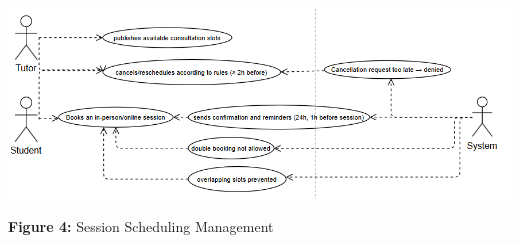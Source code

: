 

\begin{center}
\includegraphics[width=0.9\linewidth]{images/UC-03.png}
\end{center}

\begin{center}
\textbf{Figure 4:}  Session Scheduling Management
\end{center}

